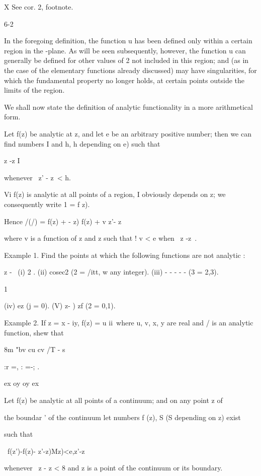 X See  cor. 2, footnote.

6-2

%
%

In the foregoing definition, the function u has been defined only
within a certain region in the -plane. As will be seen subsequently,
however, the function u can generally be defined for other values of 2
not included in this region; and (as in the case of the elementary
functions already discussed) may have singularities, for which the
fundamental property no longer holds, at certain points outside the
limits of the region.

We shall now state the definition of analytic functionality in a more
arithmetical form.

Let f(z) be analytic at z, and let e be an arbitrary positive number;
then we can find numbers I and h, h depending on e) such that

z -z I

whenever \ z' - z\ < h.

Vi f(z) is analytic at all points of a region, I obviously depends on
z; we consequently write 1 = f z).

Hence /(/) = f(z) + - z) f(z) + v z'- z\

where v is a function of z and z such that ! v < e when \ z -z\ < t>.

Example 1. Find the points at which the following functions are not
analytic :

z - \ (i) 2 . (ii) cosec2 (2 = /itt, w any integer). (iii) - - - - -
(3 = 2,3).

1

(iv) ez (j = 0). (V) z- ) zf (2 = 0,1).

Example 2. If z = x - iy, f(z) = u ii\ where u, v, x, y are real and /
is an analytic function, shew that

8m "bv cu cv /T - s

 :r =, : =-; . 

ex oy oy ex


Let f(z) be analytic at all points of a continuum; and on any point z
of

the boundar ' of the continuum let numbers f (z), S (S depending on z)
exist

such that

\ f(z')-f(z)- z'-z)Mz)<e,z'-z\

whenever \ z - z < 8 and z is a point of the continuum or its
boundary.

